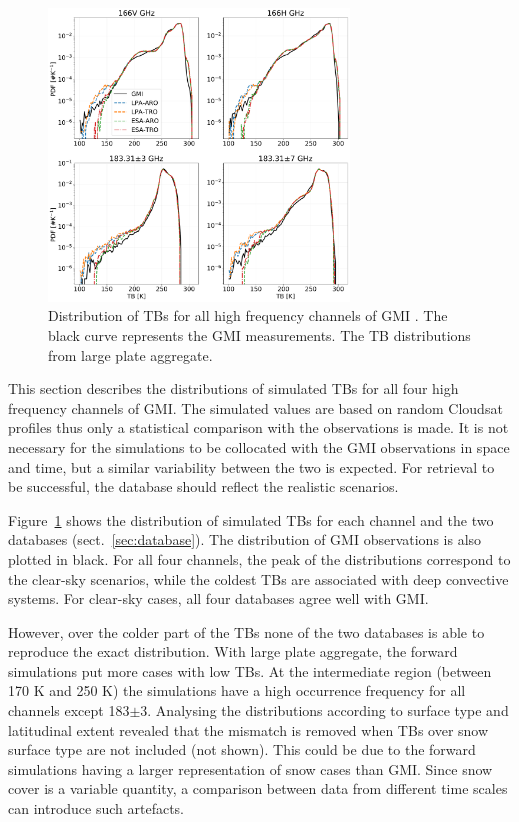 \documentclass[amt, manuscript]{copernicus}
\begin{document}
\begin{figure}[t]
	\includegraphics[width=8cm]{Figures/PDF_TB_jan.pdf}
	\caption{Distribution of TBs for all high frequency channels of GMI . The black curve represents the GMI measurements. The TB distributions from large plate aggregate.}
	\label{fig:hist_TB}
\end{figure}


This section describes the distributions of simulated TBs for all four high frequency channels of GMI. The simulated values are based on random Cloudsat profiles thus only a statistical comparison with the observations is made. It is not necessary for the simulations to be collocated with the GMI observations in space and time, but a similar variability between the two is expected. For retrieval to be successful, the database should reflect the realistic scenarios. 

Figure~\ref{fig:hist_TB} shows the distribution of simulated TBs for each channel and the two databases (sect.~\ref{sec:database}). The distribution of GMI observations is also plotted in black. For all four channels, the peak of the distributions correspond to the clear-sky scenarios, while the coldest TBs are associated with deep convective systems. For clear-sky cases, all four databases agree well with GMI.

However, over the colder part of the TBs none of the two databases is able to reproduce the exact distribution. With large plate aggregate, the forward simulations put more cases with low TBs. At the intermediate region (between 170\,\,K and 250\,\,K) the simulations have a high occurrence frequency for all channels except 183$\pm$3. Analysing the distributions according to surface type and latitudinal extent revealed that the mismatch is removed when TBs over snow surface type are not included (not shown). This could be due to the forward simulations having a larger representation of snow cases than GMI. Since snow cover is a variable quantity, a comparison between data from different time scales can introduce such artefacts. 
\end{document}
